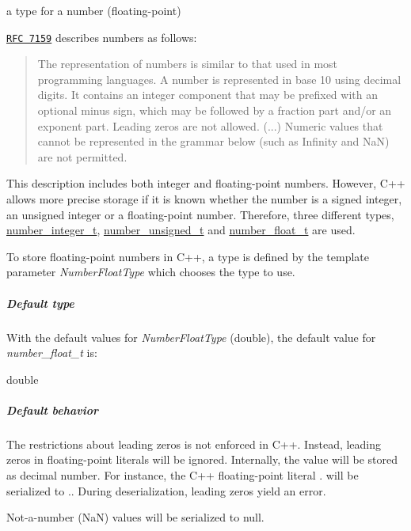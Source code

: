 a type for a number (floating-\/point) 

\href{http://rfc7159.net/rfc7159}{\tt R\+FC 7159} describes numbers as follows\+: \begin{quote}
The representation of numbers is similar to that used in most programming languages. A number is represented in base 10 using decimal digits. It contains an integer component that may be prefixed with an optional minus sign, which may be followed by a fraction part and/or an exponent part. Leading zeros are not allowed. (...) Numeric values that cannot be represented in the grammar below (such as Infinity and NaN) are not permitted. \end{quote}


This description includes both integer and floating-\/point numbers. However, C++ allows more precise storage if it is known whether the number is a signed integer, an unsigned integer or a floating-\/point number. Therefore, three different types, \hyperlink{classnlohmann_1_1basic__json_a11e390944da90db83089eb2426a749d3}{number\+\_\+integer\+\_\+t}, \hyperlink{classnlohmann_1_1basic__json_ae09af9c23351b7245d9be4d1b2035fef}{number\+\_\+unsigned\+\_\+t} and \hyperlink{classnlohmann_1_1basic__json_a5b8abaebd922d82d69756327c0c347e6}{number\+\_\+float\+\_\+t} are used.

To store floating-\/point numbers in C++, a type is defined by the template parameter {\itshape Number\+Float\+Type} which chooses the type to use.

\subparagraph*{Default type}

With the default values for {\itshape Number\+Float\+Type} ({\ttfamily double}), the default value for {\itshape number\+\_\+float\+\_\+t} is\+:


\begin{DoxyCode}
\textcolor{keywordtype}{double}
\end{DoxyCode}


\subparagraph*{Default behavior}


\begin{DoxyItemize}
\item The restrictions about leading zeros is not enforced in C++. Instead, leading zeros in floating-\/point literals will be ignored. Internally, the value will be stored as decimal number. For instance, the C++ floating-\/point literal {.} will be serialized to {.}. During deserialization, leading zeros yield an error.
\item Not-\/a-\/number (NaN) values will be serialized to {\ttfamily null}.
\end{DoxyItemize}

